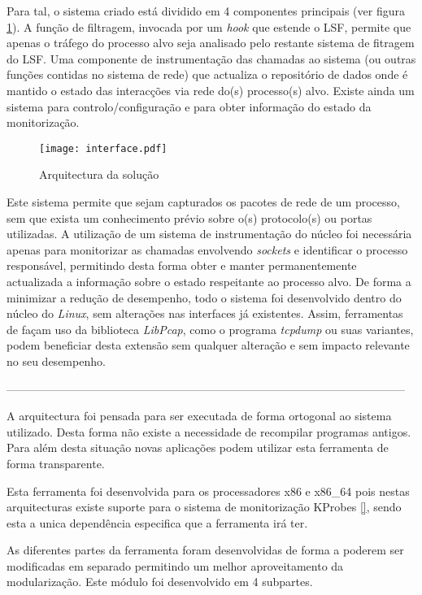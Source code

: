 Para tal, o sistema criado está dividido em 4 componentes principais (ver figura \ref{arquitectura}).
 A função de filtragem, invocada por um \textit{hook} que estende o LSF, permite que apenas o tráfego do processo alvo seja analisado pelo restante sistema de fitragem do LSF.
 Uma componente de instrumentação das chamadas ao sistema (ou outras funções contidas no sistema de rede) que actualiza o repositório de dados onde é mantido o estado das interacções via rede do(s) processo(s) alvo.
 Existe ainda um sistema para controlo/configuração e para obter informação do estado da monitorização.

\begin{figure}[htbp]
\begin{center}
\texttt{[image: interface.pdf]} 
\caption{Arquitectura da solução}
\label{arquitectura}
\end{center}
\end{figure}


Este sistema permite que sejam capturados os pacotes de rede de um processo, sem que exista um conhecimento prévio sobre o(s) protocolo(s) ou portas utilizadas.
 A utilização de um sistema de instrumentação do núcleo foi necessária apenas para monitorizar as chamadas envolvendo \emph{sockets} e identificar o processo responsável, permitindo desta forma obter e manter permanentemente actualizada a informação sobre o estado respeitante ao processo alvo.
 De forma a minimizar a redução de desempenho, todo o sistema foi desenvolvido dentro do núcleo do \textit{Linux}, sem alterações nas interfaces já existentes.
 Assim, ferramentas de façam uso da biblioteca \textit{LibPcap}, como o programa \textit{tcpdump} ou suas variantes, podem beneficiar desta extensão sem qualquer alteração e sem impacto relevante no seu desempenho.

---------------------------------------------------------------------------------------------------------

A arquitectura foi pensada para ser executada de forma ortogonal ao sistema utilizado.
 Desta forma não existe a necessidade de recompilar programas antigos.
 Para além desta situação novas aplicações podem utilizar esta ferramenta de forma transparente.

Esta ferramenta foi desenvolvida para os processadores x86 e x86\_64 pois nestas arquitecturas existe suporte para o sistema de monitorização KProbes \ref{}, sendo esta a unica dependência especifica que a ferramenta irá ter.

As diferentes partes da ferramenta foram desenvolvidas de forma a poderem ser modificadas em separado permitindo um melhor aproveitamento da modularização.
Este módulo foi desenvolvido em 4 subpartes. 

